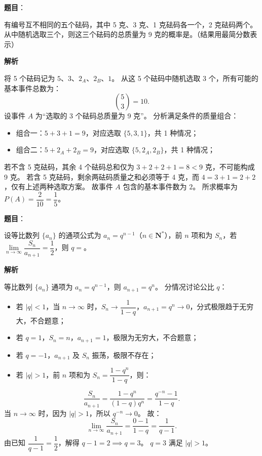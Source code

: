 \begin{answer}

\textbf{题目}：

有编号互不相同的五个砝码，其中 5 克、3 克、1 克砝码各一个，2 克砝码两个。从中随机选取三个，则这三个砝码的总质量为 9 克的概率是\gkblank{}。（结果用最简分数表示）

\textbf{解析}

将 5 个砝码记为 $5$、$3$、$2_A$、$2_B$、$1$。
从这 5 个砝码中随机选取 3 个，所有可能的基本事件总数为：
\nopagebreak[4]
\[\binom{5}{3} = 10.\]
设事件 $A$ 为“选取的 3 个砝码总质量为 9 克”。
分析满足条件的质量组合：
\begin{itemize}
\item 组合一：$5 + 3 + 1 = 9$，对应选取 $\{5, 3, 1\}$，共 1 种情况；
\item 组合二：$5 + 2_A + 2_B = 9$，对应选取 $\{5, 2_A, 2_B\}$，共 1 种情况；
\end{itemize}
若不含 5 克砝码，其余 4 个砝码总和仅为 $3 + 2 + 2 + 1 = 8 < 9$ 克，不可能构成 9 克。
若含 5 克砝码，剩余两砝码质量之和必须等于 4 克，而 $4 = 3 + 1 = 2 + 2$，仅有上述两种选取方案。
故事件 $A$ 包含的基本事件数为 $2$。
所求概率为 $P(A) = \dfrac{2}{10} = \dfrac{1}{5}$。


\end{answer}
\begin{answer}

\textbf{题目}：

设等比数列 $\{a_n\}$ 的通项公式为 $a_n = q^{n-1}$（$n \in \mathbf{N}^*$），前 $n$ 项和为 $S_n$，若 $\lim\limits_{n \to \infty} \dfrac{S_n}{a_{n+1}} = \dfrac{1}{2}$，则 $q =$\gkblank{}。

\textbf{解析}

等比数列 $\{a_n\}$ 通项为 $a_n = q^{n-1}$，则 $a_{n+1} = q^n$。
分情况讨论公比 $q$：
\begin{itemize}
\item 若 $|q| < 1$，当 $n \to \infty$ 时，$S_n \to \dfrac{1}{1 - q}$，$a_{n+1} = q^n \to 0$，分式极限趋于无穷大，不合题意；
\item 若 $q = 1$，$S_n = n$，$a_{n+1} = 1$，极限为无穷大，不合题意；
\item 若 $q = -1$，$a_{n+1}$ 及 $S_n$ 振荡，极限不存在；
\item 若 $|q| > 1$，前 $n$ 项和为 $S_n = \dfrac{1 - q^n}{1 - q}$，则：
\end{itemize}
\nopagebreak[4]
\[\frac{S_n}{a_{n+1}} = \frac{1 - q^n}{(1 - q)q^n} = \frac{q^{-n} - 1}{1 - q}.\]
当 $n \to \infty$ 时，因为 $|q| > 1$，所以 $q^{-n} \to 0$。
故：
\nopagebreak[4]
\[\lim_{n \to \infty} \frac{S_n}{a_{n+1}} = \frac{0 - 1}{1 - q} = \frac{1}{q - 1}.\]
由已知 $\dfrac{1}{q - 1} = \dfrac{1}{2}$，解得 $q - 1 = 2 \implies q = 3$。
$q = 3$ 满足 $|q| > 1$。


\end{answer}
